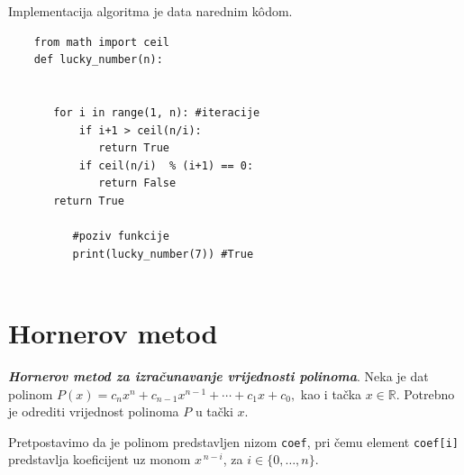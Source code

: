  
 Implementacija algoritma je data narednim k\^odom. 
 
 \begin{verbatim}
 	from math import ceil
 	def lucky_number(n):
 
 	      
 	   for i in range(1, n): #iteracije
 	       if i+1 > ceil(n/i):
 	          return True 
 	       if ceil(n/i)  % (i+1) == 0:
 	          return False
 	   return True       
    
          #poziv funkcije
          print(lucky_number(7)) #True	       
  
 \end{verbatim}
  
 
 
 \section{Hornerov metod}
 
 \begin{definition}
 	\textbf{\textit{Hornerov metod za izračunavanje vrijednosti polinoma}}. Neka je dat polinom 
 	$P(x)=c_nx^n+c_{n-1}x^{n-1}+\cdots+c_1x+c_0,$ 
 	kao i tačka $x\in\mathbb{R}$. Potrebno je odrediti vrijednost polinoma $P$ u tački $x$. 
 	
 	Pretpostavimo da je polinom predstavljen nizom \texttt{coef}, pri čemu element \texttt{coef[i]} predstavlja koeficijent uz monom $x^{\,n-i}$, za $i\in\{0,\ldots,n\}$.
 	
 \end{definition}
 
